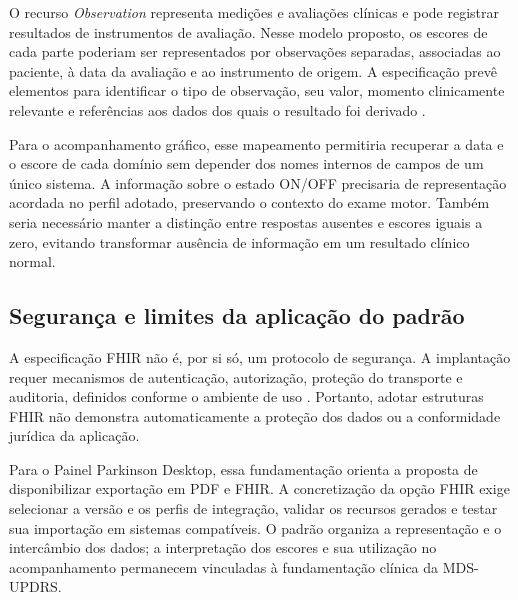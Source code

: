 O recurso \textit{Observation} representa medições e avaliações clínicas e pode registrar resultados de instrumentos de avaliação. Nesse modelo proposto, os escores de cada parte poderiam ser representados por observações separadas, associadas ao paciente, à data da avaliação e ao instrumento de origem. A especificação prevê elementos para identificar o tipo de observação, seu valor, momento clinicamente relevante e referências aos dados dos quais o resultado foi derivado \cite{hl7FHIRobservation2023}.

Para o acompanhamento gráfico, esse mapeamento permitiria recuperar a data e o escore de cada domínio sem depender dos nomes internos de campos de um único sistema. A informação sobre o estado ON/OFF precisaria de representação acordada no perfil adotado, preservando o contexto do exame motor. Também seria necessário manter a distinção entre respostas ausentes e escores iguais a zero, evitando transformar ausência de informação em um resultado clínico normal.

\subsection{Segurança e limites da aplicação do padrão}

A especificação FHIR não é, por si só, um protocolo de segurança. A implantação requer mecanismos de autenticação, autorização, proteção do transporte e auditoria, definidos conforme o ambiente de uso \cite{hl7FHIRsecurity2023}. Portanto, adotar estruturas FHIR não demonstra automaticamente a proteção dos dados ou a conformidade jurídica da aplicação.

Para o Painel Parkinson Desktop, essa fundamentação orienta a proposta de disponibilizar exportação em PDF e FHIR. A concretização da opção FHIR exige selecionar a versão e os perfis de integração, validar os recursos gerados e testar sua importação em sistemas compatíveis. O padrão organiza a representação e o intercâmbio dos dados; a interpretação dos escores e sua utilização no acompanhamento permanecem vinculadas à fundamentação clínica da MDS-UPDRS.
